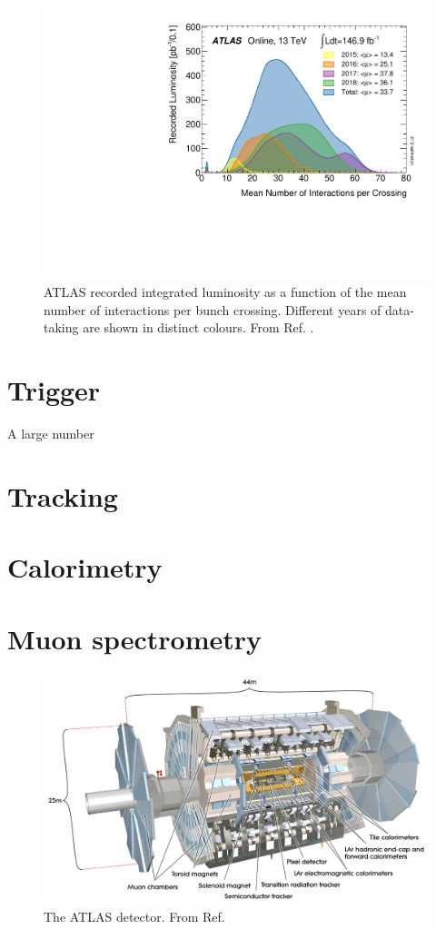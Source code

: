 \begin{figure}[h]
  \centering
  \includegraphics[width=1\textwidth]{figures/experiment/pileup}
  \caption[Mean number of interactions per bunch crossing]{ATLAS recorded
  integrated luminosity as a function of the mean number
  of interactions per bunch crossing. Different years of data-taking
  are shown in distinct colours. From Ref. \cite{pileup}.}
  \label{fig:exp:pileup}
\end{figure}

\section{Trigger}

A large number 

\section{Tracking}

\section{Calorimetry}

\section{Muon spectrometry}

\begin{figure}[h]
  \centering
  \includegraphics[width=1\textwidth]{figures/experiment/atlas}
  \caption[The ATLAS detector.]{The ATLAS detector. From Ref. \cite{CERN:39038}}
   \label{fig:exp:atlas}
\end{figure}
